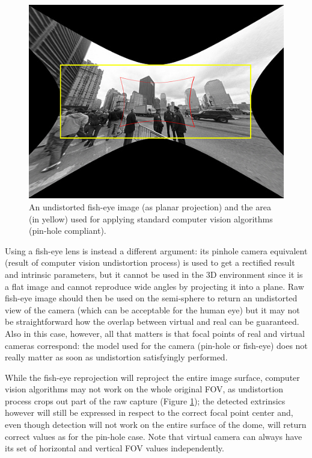 \begin{figure}
\centering
\includegraphics[width=0.8\linewidth]{pictures/undistorted_fisheye_area}
\caption{An undistorted fish-eye image (as planar projection) and the area (in yellow) used for applying standard computer vision algorithms (pin-hole compliant).}
\label{fig:fisheye_cv_undistortion}
\end{figure}

Using a fish-eye lens is instead a different argument: its pinhole camera equivalent (result of computer vision undistortion process) is used to get a rectified result and intrinsic parameters, but it cannot be used in the 3D environment since it is a flat image and cannot reproduce wide angles by projecting it into a plane. Raw fish-eye image should then be used on the semi-sphere to return an undistorted view of the camera (which can be acceptable for the human eye) but it may not be straightforward how the overlap between virtual and real can be guaranteed. Also in this case, however, all that matters is that focal points of real and virtual cameras correspond: the model used for the camera (pin-hole or fish-eye) does not really matter as soon as undistortion satisfyingly performed.

While the fish-eye reprojection will reproject the entire image surface, computer vision algorithms may not work on the whole original FOV, as undistortion process crops out part of the raw capture (Figure \ref{fig:fisheye_cv_undistortion}); the detected extrinsics however will still be expressed in respect to the correct focal point center and, even though detection will not work on the entire surface of the dome, will return correct values as for the pin-hole case. Note that virtual camera can always have its set of horizontal and vertical FOV values independently.

